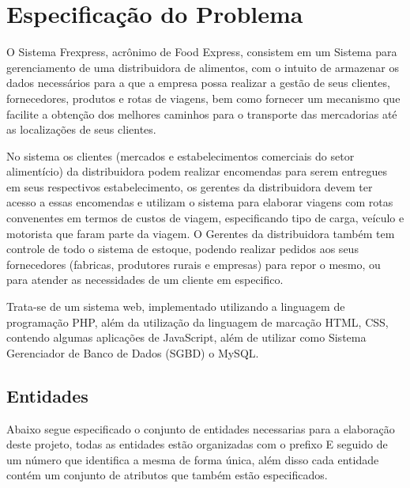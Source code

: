 \documentclass[12pt, onecolumn, titlepage]{article}
\begin{document}
\section{Especificação do Problema}
\label{sect:especificacao}

O Sistema Frexpress, acrônimo de Food Express, consistem em um Sistema para gerenciamento de uma distribuidora de alimentos, com o intuito de armazenar os dados necessários para a que a empresa possa realizar a gestão de seus clientes, fornecedores, produtos e rotas de viagens, bem como fornecer um mecanismo que facilite a obtenção dos melhores caminhos para o transporte das mercadorias até as localizações de seus clientes.

No sistema os clientes (mercados e estabelecimentos comerciais do setor alimentício) da distribuidora podem realizar encomendas para serem entregues em seus respectivos estabelecimento, os gerentes da distribuidora devem ter acesso a essas encomendas e utilizam o sistema para elaborar viagens com rotas convenentes em termos de custos de viagem, especificando tipo de carga, veículo e motorista que faram parte da viagem. O Gerentes da distribuidora também tem controle de todo o sistema de estoque, podendo realizar pedidos aos seus fornecedores (fabricas, produtores rurais e empresas) para repor o mesmo, ou para atender as necessidades de um cliente em especifico.

Trata-se de um sistema web, implementado utilizando a linguagem de programação PHP, além da utilização da linguagem de marcação HTML, CSS, contendo algumas aplicações de JavaScript, além de utilizar como Sistema Gerenciador de Banco de Dados (SGBD) o MySQL.

\subsection{Entidades}
\label{sect:entidades}

Abaixo segue especificado o conjunto de entidades necessarias para a elaboração deste projeto, todas as entidades estão organizadas com o prefixo E seguido de um número que identifica a mesma de forma única, além disso cada entidade contém um conjunto de atributos que também estão especificados.
\end{document}
